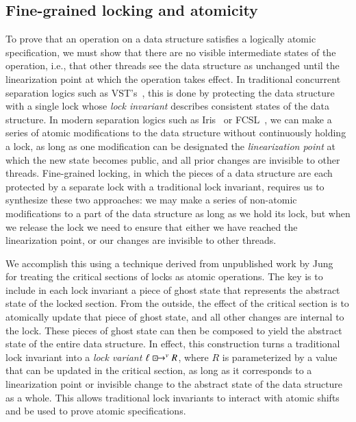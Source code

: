 \documentclass[a4paper,USenglish,cleveref, autoref, thm-restate]{lipics-v2021}
\newcommand{\islock}{\boxdotright}
\newcommand{\lockvar}{\islock^{v}}
\begin{document}
\subsection{Fine-grained locking and atomicity}
\label{atomicity}

To prove that an operation on a data structure satisfies a logically atomic specification, we must show that there are no visible intermediate states of the operation, i.e., that other threads see the data structure as unchanged until the linearization point at which the operation takes effect. In traditional concurrent separation logics such as VST's~\cite{oraclesematic}, this is done by protecting the data structure with a single lock whose \emph{lock invariant} describes consistent states of the data structure. In modern separation logics such as Iris~\cite{iris} or FCSL~\cite{fcsl}, we can make a series of atomic modifications to the data structure without continuously holding a lock, as long as one modification can be designated the \emph{linearization point} at which the new state becomes public, and all prior changes are invisible to other threads. Fine-grained locking, in which the pieces of a data structure are each protected by a separate lock with a traditional lock invariant, requires us to synthesize these two approaches: we may make a series of non-atomic modifications to a part of the data structure as long as we hold its lock, but when we release the lock we need to ensure that either we have reached the linearization point, or our changes are invisible to other threads.

We accomplish this using a technique derived from unpublished work by Jung~\cite{ralf-convo} for treating the critical sections of locks as atomic operations. The key is to include in each lock invariant a piece of ghost state that represents the abstract state of the locked section. From the outside, the effect of the critical section is to atomically update that piece of ghost state, and all other changes are internal to the lock. These pieces of ghost state can then be composed to yield the abstract state of the entire data structure. In effect, this construction turns a traditional lock invariant into a \emph{lock variant} $\ell \lockvar R$, where $R$ is parameterized by a value that can be updated in the critical section, as long as it corresponds to a linearization point or invisible change to the abstract state of the data structure as a whole. This allows traditional lock invariants to interact with atomic shifts and be used to prove atomic specifications.
\end{document}
